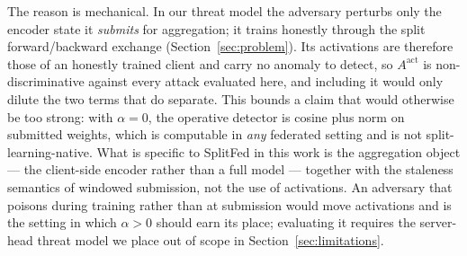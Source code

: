 \documentclass[pdflatex,sn-mathphys-num]{sn-jnl}
\begin{document}
The reason is mechanical. In our threat model the adversary perturbs only the encoder state it \emph{submits} for aggregation; it trains honestly through the split forward/backward exchange (Section~\ref{sec:problem}). Its activations are therefore those of an honestly trained client and carry no anomaly to detect, so $A^{\mathrm{act}}$ is non-discriminative against every attack evaluated here, and including it would only dilute the two terms that do separate. This bounds a claim that would otherwise be too strong: with $\alpha=0$, the operative detector is cosine plus norm on submitted weights, which is computable in \emph{any} federated setting and is not split-learning-native. What is specific to SplitFed in this work is the aggregation object --- the client-side encoder rather than a full model --- together with the staleness semantics of windowed submission, not the use of activations. An adversary that poisons during training rather than at submission would move activations and is the setting in which $\alpha>0$ should earn its place; evaluating it requires the server-head threat model we place out of scope in Section~\ref{sec:limitations}.
\end{document}
